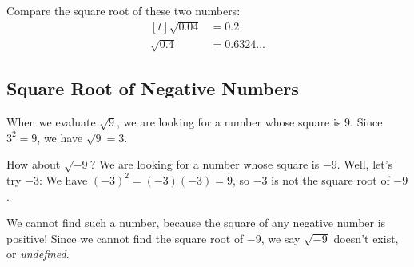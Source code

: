 Compare the square root of these two numbers:
\[
\begin{aligned}[t]
	\sqrt{0.04} &= 0.2 \\
	\sqrt{0.4} &= 0.6324...
\end{aligned}
\]

\subsection{Square Root of Negative Numbers}
When we evaluate $\sqrt{9}$, we are looking for a number whose square is $9$. Since $3^{2}=9$, we have $\sqrt{9}=3$.

How about $\sqrt{-9}$? We are looking for a number whose square is $-9$. Well, let's try $-3$: We have $(-3)^{2}=(-3)(-3)=9$, so $-3$ is not the square root of $-9$.

We cannot find such a number, because the square of any negative number is positive! Since we cannot find the square root of $-9$, we say $\sqrt{-9}$ doesn't exist, or \textit{undefined}.

